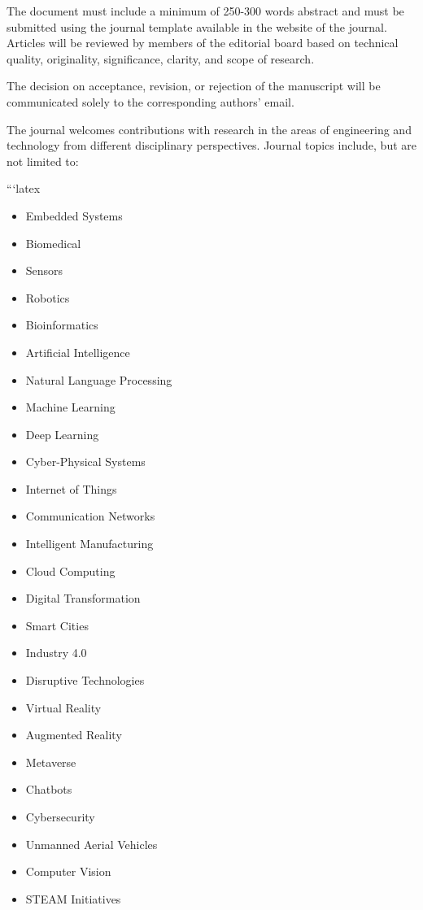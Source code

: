 \documentclass[letterpaper]{EmergentUDB}
\begin{document}
The document must include a minimum of 250-300 words abstract and must be submitted using the journal template available in the website of the journal. Articles will be reviewed by members of the editorial board based on technical quality, originality, significance, clarity, and scope of research.

The decision on acceptance, revision, or rejection of the manuscript will be communicated solely to the corresponding authors' email.

The journal welcomes contributions with research in the areas of engineering and technology from different disciplinary perspectives. Journal topics include, but are not limited to:

```latex
\begin{itemize}
    \item Embedded Systems
    \item Biomedical
    \item Sensors
    \item Robotics
    \item Bioinformatics
    \item Artificial Intelligence
    \item Natural Language Processing
    \item Machine Learning
    \item Deep Learning
    \item Cyber-Physical Systems
    \item Internet of Things
    \item Communication Networks
    \item Intelligent Manufacturing
    \item Cloud Computing
    \item Digital Transformation
    \item Smart Cities
    \item Industry 4.0
    \item Disruptive Technologies
    \item Virtual Reality
    \item Augmented Reality
    \item Metaverse
    \item Chatbots
    \item Cybersecurity
    \item Unmanned Aerial Vehicles
    \item Computer Vision
    \item STEAM Initiatives
\end{itemize}
\end{document}
